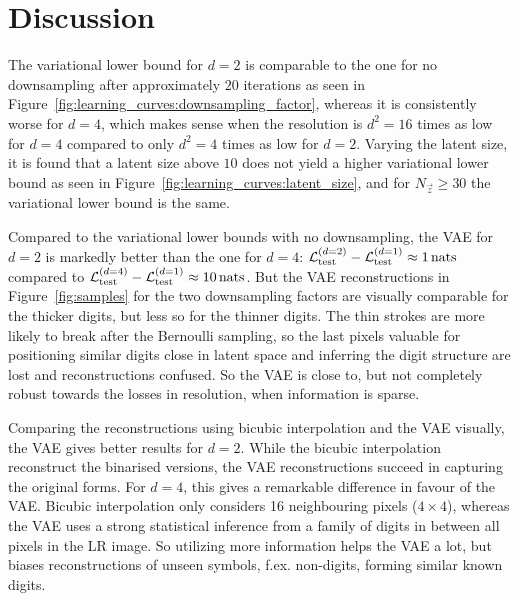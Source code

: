 \section{Discussion}
\label{sec:discussion}

The variational lower bound for $d = 2$ is comparable to the one for no downsampling after approximately $20$ iterations as seen in Figure~\ref{fig:learning_curves:downsampling_factor}, whereas it is consistently worse for $d = 4$, which makes sense when the resolution is $d^2 = 16$ times as low for $d = 4$ compared to only $d^2 = 4$ times as low for $d = 2$.
Varying the latent size, it is found that a latent size above $10$ does not yield a higher variational lower bound as seen in Figure~\ref{fig:learning_curves:latent_size}, and for $N_{\vec{z}} \geq 30$ the variational lower bound is the same.

Compared to the variational lower bounds with no downsampling, the VAE for $d = 2$ is markedly better than the one for $d = 4$: $\mathcal{L}_{\text{test}}^{(d = 2)} - \mathcal{L}_{\text{test}}^{(d = 1)} \approx \SI{1}{nats}$ compared to $\mathcal{L}_{\text{test}}^{(d = 4)} - \mathcal{L}_{\text{test}}^{(d = 1)} \approx \SI{10}{nats}$.
But the VAE reconstructions in Figure~\ref{fig:samples} for the two downsampling factors are visually comparable for the thicker digits, but less so for the thinner digits. The thin strokes are more likely to break after the Bernoulli sampling, so the last pixels valuable for positioning similar digits close in latent space and inferring the digit structure are lost and reconstructions confused.  
So the VAE is close to, but not completely robust towards the losses in resolution, when information is sparse. 

Comparing the reconstructions using bicubic interpolation and the VAE visually, the VAE gives better results for $d = 2$.
While the bicubic interpolation reconstruct the binarised versions, the VAE reconstructions succeed in capturing the original forms.
For $d = 4$, this gives a remarkable difference in favour of the VAE.
Bicubic interpolation only considers 16 neighbouring pixels ($4\times 4$), whereas the VAE uses a strong statistical inference from a family of digits in between all pixels in the LR image. So utilizing more information helps the VAE a lot, but biases reconstructions of unseen symbols, f.ex. non-digits, forming similar known digits.    
